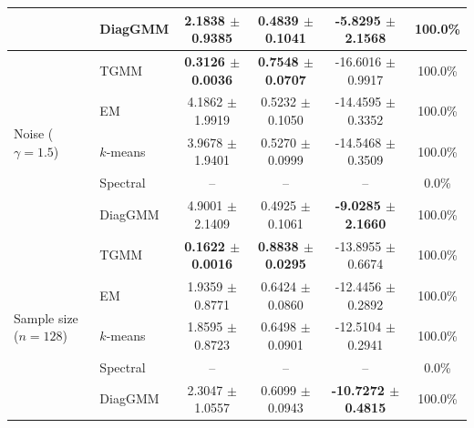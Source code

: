 \documentclass{article}
\begin{document}
\begin{table}[t]
\begin{threeparttable}
{\begin{tabular}{llcccc}
& DiagGMM & 2.1838 $\pm$ 0.9385 & 0.4839 $\pm$ 0.1041 & \textbf{-5.8295 $\pm$ 2.1568} & 100.0\% \\
\midrule
\multirow{5}{*}{Noise ($\gamma=1.5$)}
& TGMM & \textbf{0.3126 $\pm$ 0.0036} & \textbf{0.7548 $\pm$ 0.0707} & -16.6016 $\pm$ 0.9917 & 100.0\% \\
& EM & 4.1862 $\pm$ 1.9919 & 0.5232 $\pm$ 0.1050 & -14.4595 $\pm$ 0.3352 & 100.0\% \\
& $k$-means & 3.9678 $\pm$ 1.9401 & 0.5270 $\pm$ 0.0999 & -14.5468 $\pm$ 0.3509 & 100.0\% \\
& Spectral & -- & -- & -- & 0.0\% \\
& DiagGMM & 4.9001 $\pm$ 2.1409 & 0.4925 $\pm$ 0.1061 & \textbf{-9.0285 $\pm$ 2.1660} & 100.0\% \\
\midrule
\multirow{5}{*}{Sample size ($n=128$)}
& TGMM & \textbf{0.1622 $\pm$ 0.0016} & \textbf{0.8838 $\pm$ 0.0295} & -13.8955 $\pm$ 0.6674 & 100.0\% \\
& EM & 1.9359 $\pm$ 0.8771 & 0.6424 $\pm$ 0.0860 & -12.4456 $\pm$ 0.2892 & 100.0\% \\
& $k$-means & 1.8595 $\pm$ 0.8723 & 0.6498 $\pm$ 0.0901 & -12.5104 $\pm$ 0.2941 & 100.0\% \\
& Spectral & -- & -- & -- & 0.0\% \\
& DiagGMM & 2.3047 $\pm$ 1.0557 & 0.6099 $\pm$ 0.0943 & \textbf{-10.7272 $\pm$ 0.4815} & 100.0\% \\
\bottomrule
\end{tabular}%
}
\end{threeparttable}
\end{table}
\end{document}
